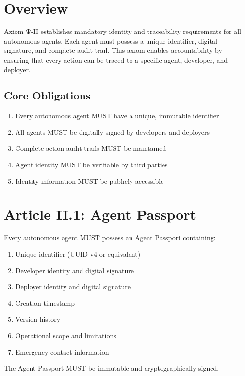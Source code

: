 \vspace{0.5cm}

\section{Overview}

Axiom Ψ-II establishes mandatory identity and traceability requirements for all autonomous agents. Each agent must possess a unique identifier, digital signature, and complete audit trail. This axiom enables accountability by ensuring that every action can be traced to a specific agent, developer, and deployer.

\subsection{Core Obligations}

\begin{enumerate}
    \item Every autonomous agent MUST have a unique, immutable identifier
    \item All agents MUST be digitally signed by developers and deployers
    \item Complete action audit trails MUST be maintained
    \item Agent identity MUST be verifiable by third parties
    \item Identity information MUST be publicly accessible
\end{enumerate}

\vspace{0.5cm}

\section{Article II.1: Agent Passport}

\begin{articlebox}
Every autonomous agent MUST possess an Agent Passport containing:
\begin{enumerate}
    \item Unique identifier (UUID v4 or equivalent)
    \item Developer identity and digital signature
    \item Deployer identity and digital signature
    \item Creation timestamp
    \item Version history
    \item Operational scope and limitations
    \item Emergency contact information
\end{enumerate}

The Agent Passport MUST be immutable and cryptographically signed.
\end{articlebox}

